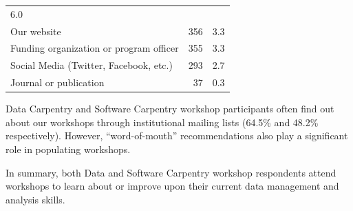 \documentclass[]{article}
\begin{document}
\begin{longtable}[]{@{}lrr@{}}
\begin{minipage}[t]{0.06\columnwidth}
6.0\strut
\end{minipage}\tabularnewline
\begin{minipage}[t]{0.78\columnwidth}\raggedright\strut
Our website\strut
\end{minipage} & \begin{minipage}[t]{0.06\columnwidth}\raggedleft\strut
356\strut
\end{minipage} & \begin{minipage}[t]{0.06\columnwidth}\raggedleft\strut
3.3\strut
\end{minipage}\tabularnewline
\begin{minipage}[t]{0.78\columnwidth}\raggedright\strut
Funding organization or program officer\strut
\end{minipage} & \begin{minipage}[t]{0.06\columnwidth}\raggedleft\strut
355\strut
\end{minipage} & \begin{minipage}[t]{0.06\columnwidth}\raggedleft\strut
3.3\strut
\end{minipage}\tabularnewline
\begin{minipage}[t]{0.78\columnwidth}\raggedright\strut
Social Media (Twitter, Facebook, etc.)\strut
\end{minipage} & \begin{minipage}[t]{0.06\columnwidth}\raggedleft\strut
293\strut
\end{minipage} & \begin{minipage}[t]{0.06\columnwidth}\raggedleft\strut
2.7\strut
\end{minipage}\tabularnewline
\begin{minipage}[t]{0.78\columnwidth}\raggedright\strut
Journal or publication\strut
\end{minipage} & \begin{minipage}[t]{0.06\columnwidth}\raggedleft\strut
37\strut
\end{minipage} & \begin{minipage}[t]{0.06\columnwidth}\raggedleft\strut
0.3\strut
\end{minipage}\tabularnewline
\bottomrule
\end{longtable}

Data Carpentry and Software Carpentry workshop participants often find
out about our workshops through institutional mailing lists (64.5\% and
48.2\% respectively). However, ``word-of-mouth'' recommendations also
play a significant role in populating workshops.

In summary, both Data and Software Carpentry workshop respondents attend
workshops to learn about or improve upon their current data management
and analysis skills.
\end{document}
